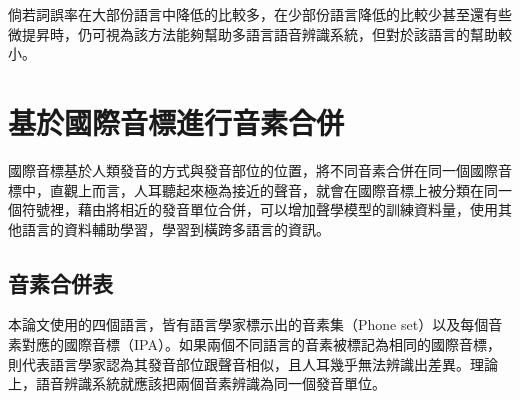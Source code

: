 倘若詞誤率在大部份語言中降低的比較多，在少部份語言降低的比較少甚至還有些微提昇時，仍可視為該方法能夠幫助多語言語音辨識系統，但對於該語言的幫助較小。


\section{基於國際音標進行音素合併}

國際音標基於人類發音的方式與發音部位的位置，將不同音素合併在同一個國際音標中，直觀上而言，人耳聽起來極為接近的聲音，就會在國際音標上被分類在同一個符號裡，藉由將相近的發音單位合併，可以增加聲學模型的訓練資料量，使用其他語言的資料輔助學習，學習到橫跨多語言的資訊。

\subsection{音素合併表}
本論文使用的四個語言，皆有語言學家標示出的音素集（Phone set）以及每個音素對應的國際音標（IPA）。如果兩個不同語言的音素被標記為相同的國際音標，則代表語言學家認為其發音部位跟聲音相似，且人耳幾乎無法辨識出差異。理論上，語音辨識系統就應該把兩個音素辨識為同一個發音單位。

